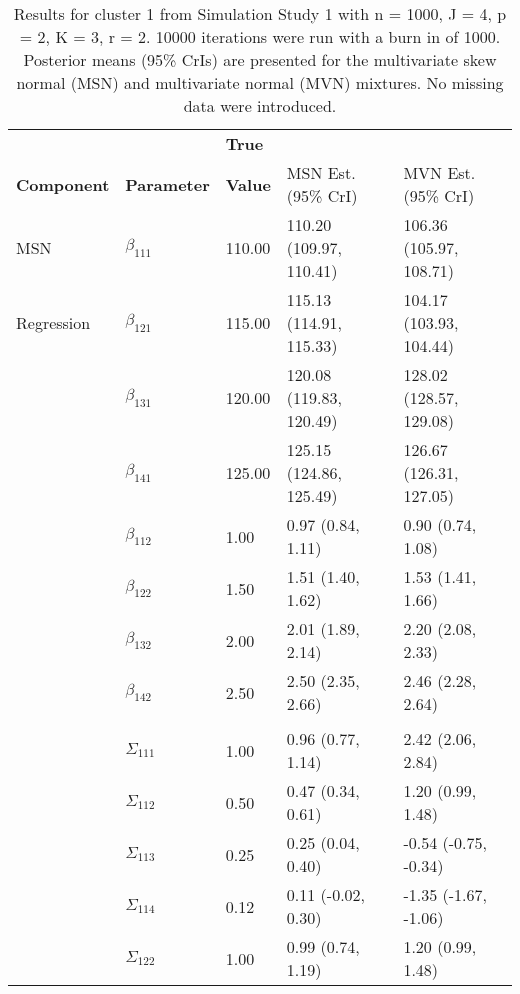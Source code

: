 \documentclass[useAMS,usenatbib,referee]{biom}
\begin{document}
\begin{table}[t]
\caption{\label{tab:sim1_parms}Results for cluster 1 from Simulation Study 1 with n = 1000, J = 4, p = 2, K = 3, r = 2. 10000 iterations were run with a burn in of 1000. Posterior means (95\% CrIs) are presented for the multivariate skew normal (MSN) and multivariate normal (MVN) mixtures. No missing data were introduced.}
\begin{center}
\begin{tabular}{lllll}
\toprule
                    &                   & \textbf{True}  &                     &           \\
\textbf{Component} & \textbf{Parameter} & \textbf{Value} & MSN Est. (95\% CrI) & MVN Est. (95\% CrI) \\
\midrule
MSN & $\beta_{111}$ & 110.00 & 110.20 (109.97, 110.41) & 106.36 (105.97, 108.71)\\
Regression & $\beta_{121}$ & 115.00 & 115.13 (114.91, 115.33) & 104.17 (103.93, 104.44) \\
 & $\beta_{131}$ & 120.00 & 120.08 (119.83, 120.49) & 128.02 (128.57, 129.08) \\
 & $\beta_{141}$ & 125.00 & 125.15 (124.86, 125.49) & 126.67 (126.31, 127.05) \\
 & $\beta_{112}$ & 1.00 & 0.97 (0.84, 1.11) & 0.90 (0.74, 1.08)\\
 & $\beta_{122}$ & 1.50 & 1.51 (1.40, 1.62) & 1.53 (1.41, 1.66)\\
 & $\beta_{132}$ & 2.00 & 2.01 (1.89, 2.14) & 2.20 (2.08, 2.33)\\
 & $\beta_{142}$ & 2.50 & 2.50 (2.35, 2.66) & 2.46 (2.28, 2.64)\\
\addlinespace[0.2em]
\multicolumn{5}{l}{\textbf{ }}\\
\hspace{1em} & $\Sigma_{111}$ & 1.00 & 0.96 (0.77, 1.14) & 2.42 (2.06, 2.84) \\
\hspace{1em} & $\Sigma_{112}$ & 0.50 & 0.47 (0.34, 0.61) & 1.20 (0.99, 1.48) \\
\hspace{1em} & $\Sigma_{113}$ & 0.25 & 0.25 (0.04, 0.40) & -0.54 (-0.75, -0.34) \\
\hspace{1em} & $\Sigma_{114}$ & 0.12 & 0.11 (-0.02, 0.30) & -1.35 (-1.67, -1.06)\\
\hspace{1em} & $\Sigma_{122}$ & 1.00 & 0.99 (0.74, 1.19) & 1.20 (0.99, 1.48) \\

\end{tabular}
\end{center}
\end{table}
\end{document}
